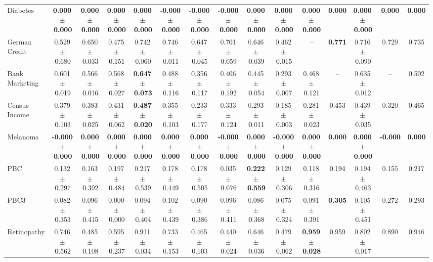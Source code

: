 \documentclass[8pt]{extarticle}
\begin{document}
\begin{longtable}{l*{14}{c}}
Diabetes & \textbf{0.000\,$\pm$\,0.000} & \textbf{0.000\,$\pm$\,0.000} & \textbf{0.000\,$\pm$\,0.000} & \textbf{0.000\,$\pm$\,0.000} & \textbf{-0.000\,$\pm$\,0.000} & \textbf{-0.000\,$\pm$\,0.000} & \textbf{-0.000\,$\pm$\,0.000} & \textbf{0.000\,$\pm$\,0.000} & \textbf{0.000\,$\pm$\,0.000} & \textbf{0.000\,$\pm$\,0.000} & \textbf{0.000} & \textbf{0.000\,$\pm$\,0.000} & \textbf{0.000} & \textbf{0.000} \\
German Credit & 0.529\,$\pm$\,0.680 & 0.650\,$\pm$\,0.033 & 0.475\,$\pm$\,0.151 & 0.742\,$\pm$\,0.060 & 0.746\,$\pm$\,0.011 & 0.647\,$\pm$\,0.045 & 0.701\,$\pm$\,0.059 & 0.646\,$\pm$\,0.039 & 0.462\,$\pm$\,0.015 & -- & \textbf{0.771} & 0.716\,$\pm$\,0.090 & 0.729 & 0.735 \\
Bank Marketing & 0.601\,$\pm$\,0.019 & 0.566\,$\pm$\,0.016 & 0.568\,$\pm$\,0.027 & \textbf{0.647\,$\pm$\,0.073} & 0.488\,$\pm$\,0.116 & 0.356\,$\pm$\,0.117 & 0.406\,$\pm$\,0.192 & 0.445\,$\pm$\,0.054 & 0.293\,$\pm$\,0.007 & 0.468\,$\pm$\,0.121 & -- & 0.635\,$\pm$\,0.012 & -- & 0.502 \\
Census Income & 0.379\,$\pm$\,0.103 & 0.383\,$\pm$\,0.025 & 0.431\,$\pm$\,0.062 & \textbf{0.487\,$\pm$\,0.020} & 0.355\,$\pm$\,0.103 & 0.233\,$\pm$\,0.177 & 0.333\,$\pm$\,0.124 & 0.293\,$\pm$\,0.011 & 0.185\,$\pm$\,0.003 & 0.281\,$\pm$\,0.023 & 0.453 & 0.439\,$\pm$\,0.035 & 0.320 & 0.465 \\
Melanoma & \textbf{-0.000\,$\pm$\,0.000} & \textbf{0.000\,$\pm$\,0.000} & \textbf{0.000\,$\pm$\,0.000} & \textbf{0.000\,$\pm$\,0.000} & \textbf{0.000\,$\pm$\,0.000} & \textbf{0.000\,$\pm$\,0.000} & \textbf{-0.000\,$\pm$\,0.000} & \textbf{0.000\,$\pm$\,0.000} & \textbf{-0.000\,$\pm$\,0.000} & \textbf{0.000\,$\pm$\,0.000} & \textbf{0.000} & \textbf{0.000\,$\pm$\,0.000} & \textbf{-0.000} & \textbf{0.000} \\
PBC & 0.132\,$\pm$\,0.297 & 0.163\,$\pm$\,0.392 & 0.197\,$\pm$\,0.484 & 0.217\,$\pm$\,0.539 & 0.178\,$\pm$\,0.449 & 0.178\,$\pm$\,0.505 & 0.035\,$\pm$\,0.076 & \textbf{0.222\,$\pm$\,0.559} & 0.129\,$\pm$\,0.306 & 0.118\,$\pm$\,0.316 & 0.194 & 0.194\,$\pm$\,0.463 & 0.155 & 0.217 \\
PBC3 & 0.082\,$\pm$\,0.353 & 0.096\,$\pm$\,0.415 & 0.000\,$\pm$\,0.000 & 0.094\,$\pm$\,0.404 & 0.102\,$\pm$\,0.439 & 0.090\,$\pm$\,0.386 & 0.096\,$\pm$\,0.411 & 0.086\,$\pm$\,0.368 & 0.075\,$\pm$\,0.324 & 0.091\,$\pm$\,0.391 & \textbf{0.305} & 0.105\,$\pm$\,0.451 & 0.272 & 0.293 \\
Retinopathy & 0.746\,$\pm$\,0.562 & 0.485\,$\pm$\,0.108 & 0.595\,$\pm$\,0.237 & 0.911\,$\pm$\,0.034 & 0.733\,$\pm$\,0.153 & 0.465\,$\pm$\,0.103 & 0.440\,$\pm$\,0.024 & 0.646\,$\pm$\,0.036 & 0.479\,$\pm$\,0.062 & \textbf{0.959\,$\pm$\,0.028} & 0.959 & 0.802\,$\pm$\,0.017 & 0.890 & 0.946 \\

\end{longtable}
\end{document}
